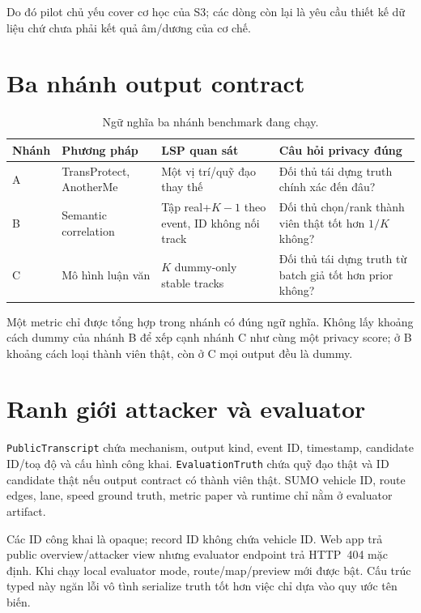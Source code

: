 \documentclass[12pt,a4paper,oneside]{report}
\begin{document}
Do đó pilot chủ yếu cover cơ học của S3; các dòng còn lại là yêu cầu thiết kế dữ liệu chứ chưa phải kết quả âm/dương của cơ chế.

\section{Ba nhánh output contract}

\begin{table}[htbp]
\centering
\small
\caption{Ngữ nghĩa ba nhánh benchmark đang chạy.}
\label{tab:benchmark-tracks}
\begin{tabularx}{\textwidth}{P{2.0cm}P{3.2cm}P{3.1cm}Y}
\toprule
\textbf{Nhánh} & \textbf{Phương pháp} & \textbf{LSP quan sát} & \textbf{Câu hỏi privacy đúng} \\
\midrule
A & TransProtect, AnotherMe & Một vị trí/quỹ đạo thay thế & Đối thủ tái dựng truth chính xác đến đâu? \\
B & Semantic correlation & Tập real+$K-1$ theo event, ID không nối track & Đối thủ chọn/rank thành viên thật tốt hơn $1/K$ không? \\
C & Mô hình luận văn & $K$ dummy-only stable tracks & Đối thủ tái dựng truth từ batch giả tốt hơn prior không? \\
\bottomrule
\end{tabularx}
\end{table}

Một metric chỉ được tổng hợp trong nhánh có đúng ngữ nghĩa. Không lấy khoảng cách dummy của nhánh B để xếp cạnh nhánh C như cùng một privacy score; ở B khoảng cách loại thành viên thật, còn ở C mọi output đều là dummy.

\section{Ranh giới attacker và evaluator}

\texttt{PublicTranscript} chứa mechanism, output kind, event ID, timestamp, candidate ID/toạ độ và cấu hình công khai. \texttt{EvaluationTruth} chứa quỹ đạo thật và ID candidate thật nếu output contract có thành viên thật. SUMO vehicle ID, route edges, lane, speed ground truth, metric paper và runtime chỉ nằm ở evaluator artifact.

Các ID công khai là opaque; record ID không chứa vehicle ID. Web app trả public overview/attacker view nhưng evaluator endpoint trả HTTP~404 mặc định. Khi chạy local evaluator mode, route/map/preview mới được bật. Cấu trúc typed này ngăn lỗi vô tình serialize truth tốt hơn việc chỉ dựa vào quy ước tên biến.
\end{document}
